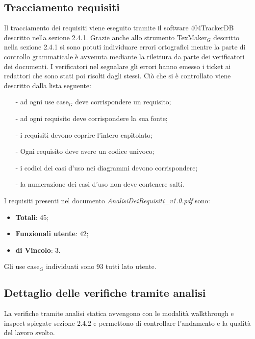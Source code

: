 \subsection{Tracciamento requisiti}
Il tracciamento dei requisiti viene eseguito tramite il software 404TrackerDB descritto nella sezione 2.4.1. 
Grazie anche allo strumento TexMaker$_G$ descritto nella sezione 2.4.1 si sono potuti individuare errori ortografici mentre la parte di controllo grammaticale è avvenuta mediante la rilettura da parte dei verificatori dei documenti. I verificatori nel segnalare gli errori hanno emesso i ticket ai redattori che sono stati poi risolti dagli stessi.
Ciò che si è controllato viene descritto dalla lista seguente:
\begin{itemize}
\item[-] ad ogni use case$_G$ deve corrispondere un requisito;
\item[-] ad ogni requisito deve corrispondere la sua fonte;
\item[-] i requisiti devono coprire l'intero capitolato;
\item[-] Ogni requisito deve avere un codice univoco;
\item[-] i codici dei casi d'uso nei diagrammi devono corrispondere;
\item[-] la numerazione dei casi d'uso non deve contenere salti.
\end{itemize}
I requisiti presenti nel documento \textit{AnalisiDeiRequisiti\_v1.0.pdf} sono:
\begin{itemize}
\item \textbf{Totali}: 45;
\item \textbf{Funzionali utente}: 42;   
\item \textbf{di Vincolo}: 3.
\end{itemize}
Gli use case$_G$ individuati sono 93 tutti lato utente.
\subsection{Dettaglio delle verifiche tramite analisi}
La verifiche tramite analisi statica avvengono con le modalità walkthrough e inspect spiegate sezione 2.4.2 e permettono di controllare l'andamento e la qualità del lavoro svolto.
